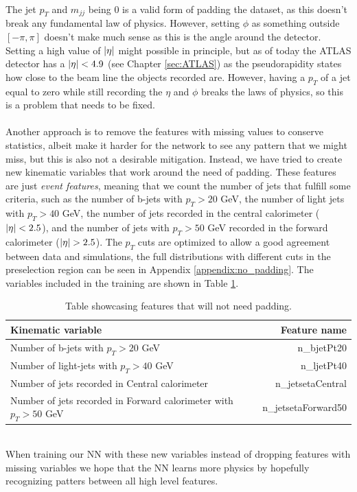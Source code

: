 \documentclass[12pt, a4paper]{book}
\begin{document}
\\The jet $p_T$ and $m_{jj}$ being 0 is a valid form of padding the dataset, as this doesn't break any fundamental law of physics. However, setting $\phi$ as something outside $[-\pi,\pi]$ doesn't make much sense 
as this is the angle around the detector. Setting a high value of $\abs{\eta}$ might possible in principle, but as of today the ATLAS detector has a $\abs{\eta}<4.9$ (see Chapter \ref{sec:ATLAS}) as the pseudorapidity 
states how close to the beam line the objects recorded are. However, having a $p_T$ of a jet equal to zero while still recording the $\eta$ and $\phi$ breaks the laws of physics, so this is a problem that needs to be fixed.\\
\\Another approach is to remove the features with missing values to conserve statistics, albeit make it harder for the network to see any pattern that we might miss, but this is also not a desirable mitigation. 
Instead, we have tried to create new kinematic variables that work around the need of padding. These features are just \textit{event features}, meaning that we count the number of jets that fulfill some criteria, 
such as the number of b-jets with $p_T > 20$ GeV, the number of light jets with $p_T>40$ GeV, the number of jets recorded in the central calorimeter ($\abs{\eta} < 2.5$), and the number of 
jets with $p_T>50$ GeV recorded in the forward calorimeter ($\abs{\eta} > 2.5$). The $p_T$ cuts are optimized to allow a good agreement between data and simulations, the full distributions with different cuts in the preselection region can be seen in Appendix \ref{appendix:no_padding}. 
The variables included in the training are shown in Table \ref{tab:padding_variables}.\\
\begin{table}[!h]
   \centering
   \caption[New features that need no padding]{Table showcasing features that will not need padding.}
   \begin{tabular}{l|r}\midrule\midrule
      Kinematic variable                                                      & Feature name          \\\midrule
      Number of b-jets with $p_T > 20$ GeV                                    & n\_bjetPt20\\
      Number of light-jets with $p_T > 40$ GeV                                & n\_ljetPt40\\
      Number of jets recorded in Central calorimeter                          &n\_jetsetaCentral\\
      Number of jets recorded in Forward calorimeter with $p_T > 50$ GeV      & n\_jetsetaForward50\\\midrule\midrule
   \end{tabular}
   \label{tab:padding_variables}
\end{table}
\\When training our NN with these new variables instead of dropping features with missing variables we hope that the NN learns more physics by hopefully recognizing patters between all high level features. 
\end{document}
